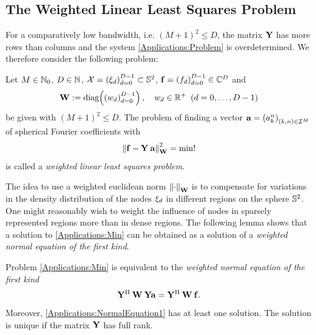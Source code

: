 \subsection{The Weighted Linear Least Squares Problem}
  For a comparatively low bandwidth, i.e. $(M+1)^2 \le D$, the matrix $\mathbf{Y}$ 
  has more rows than columns and the system \eqref{Applications:Problem} is 
  overdetermined. We therefore consider the following problem:
  \begin{definition}
    Let $M \in \mathbb{N}_{0}$, $D \in \mathbb{N}$, $\mathcal{X}=\left(\mathbf{\xi}_{d}\right)_{d=0}^{D-1} \subset \mathbb{S}^2$, 
    $\mathbf{f}=\left(f_{d}\right)_{d=0}^{D-1} \in \mathbb{C}^{D}$ and 
    \[
      \V{W} := \fun{\diag}{\paren{w_{d}}_{d=0}^{D-1}},\quad w_{d} \in \Rp \ \paren{d=0,\ldots,D-1}
    \]
    be given with $(M+1)^2 \le D$. The problem of finding a vector $\mathbf{a}=\left(a_{k}^n\right)_{(k,n) 
    \in \mathcal{I}^M}$ of spherical Fourier coefficients with
    \begin{equation}
      \label{Applications:Min}
      \left\|\mathbf{f} - \mathbf{Y}\:\mathbf{a}\right\|_{\mathbf{W}}^2 = \text{min!}
    \end{equation}
    is called a \emph{weighted linear least squares problem}.
  \end{definition}
  The idea to use a weighted euclidean norm $\left\|\cdot\right\|_{\mathbf{W}}$ is to compensate for variations in
  the density distribution of the nodes $\mathbf{\xi}_{d}$ in different regions on the sphere 
  $\mathbb{S}^2$. One might reasonably wish to weight the influence of nodes in sparsely 
  represented regions more than in dense regions. The following lemma shows that a solution to
  \eqref{Applications:Min} can be obtained as a solution of a
  \emph{weighted normal equation of the first kind}.
  \begin{lemma}
    Problem \eqref{Applications:Min} is equivalent to the 
    \emph{weighted normal equation of the first kind}
    \begin{equation}
      \label{Applications:NormalEquation1}
      \mathbf{Y}^{\text{\rm{H}}} \: \mathbf{W} \: \mathbf{Y} \mathbf{a} = \mathbf{Y}^{\text{\rm{H}}} \: \mathbf{W} \: \mathbf{f}.
    \end{equation}
    Moreover, \eqref{Applications:NormalEquation1} has at least one solution.
    The solution is unique if the matrix $\mathbf{Y}$ has full rank.
  \end{lemma}
